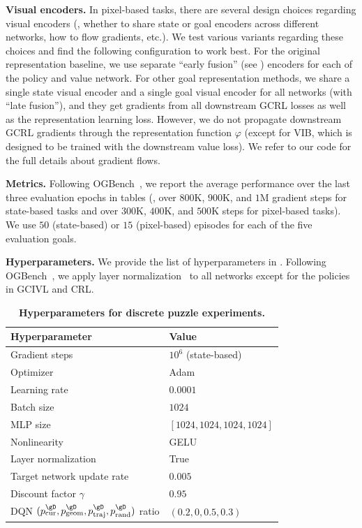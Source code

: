 \documentclass[final]{article} %
\theoremstyle{plain}
\theoremstyle{definition}
\theoremstyle{remark}
\renewcommand{\phi}{\varphi}
\begin{document}
\textbf{Visual encoders.}
In pixel-based tasks, there are several design choices regarding visual encoders
(\eg, whether to share state or goal encoders across different networks, how to flow gradients, etc.).
We test various variants regarding these choices and find the following configuration to work best.
For the original representation baseline,
we use separate ``early fusion'' (see ) encoders for each of the policy and value network.
For other goal representation methods,
we share a single state visual encoder and a single goal visual encoder for all networks (with ``late fusion''),
and they get gradients from all downstream GCRL losses as well as the representation learning loss.
However, we do not propagate downstream GCRL gradients through the representation function $\phi$
(except for VIB, which is designed to be trained with the downstream value loss).
We refer to our code for the full details about gradient flows.

\textbf{Metrics.}
Following OGBench~\citep{ogbench_park2025},
we report the average performance over the last three evaluation epochs in tables
(\ie, over $800$K, $900$K, and $1$M gradient steps for state-based tasks and over $300$K, $400$K, and $500$K steps for pixel-based tasks).
We use $50$ (state-based) or $15$ (pixel-based) episodes for each of the five evaluation goals.

\textbf{Hyperparameters.}
We provide the list of hyperparameters in .
Following OGBench~\citep{ogbench_park2025}, we apply layer normalization~\citep{ln_ba2016} to all networks
except for the policies in GCIVL and CRL.
%
%

\begin{table}[h!]
\caption{
\footnotesize
\textbf{Hyperparameters for discrete puzzle experiments.}
}
\vspace{-5pt}
\label{table:hyp_pure}
\begin{center}
\scalebox{0.75}
{
\begin{tabular}{ll}
    \toprule
    \textbf{Hyperparameter} & \textbf{Value} \\
    \midrule
    Gradient steps & $10^6$ (state-based) \\
    Optimizer & Adam~\citep{adam_kingma2015} \\
    Learning rate & $0.0001$ \\
    Batch size & $1024$ \\
    MLP size & $[1024, 1024, 1024, 1024]$ \\
    Nonlinearity & GELU~\citep{gelu_hendrycks2016} \\
    Layer normalization & True \\
    Target network update rate & $0.005$ \\
    Discount factor $\gamma$ & $0.95$ \\
    DQN $(p^\gD_\mathrm{cur}, p^\gD_\mathrm{geom}, p^\gD_\mathrm{traj}, p^\gD_\mathrm{rand})$ ratio & $(0.2, 0, 0.5, 0.3)$ \\
    \bottomrule
\end{tabular}
}
\end{center}
\end{table}
\end{document}
